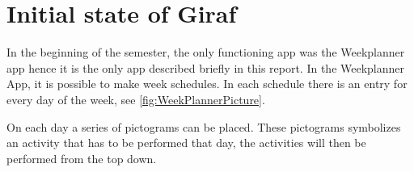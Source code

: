 \section{Initial state of Giraf}
In the beginning of the semester, the only functioning app was the Weekplanner app\cite{AppsStatus2019} hence it is the only app described briefly in this report. In the Weekplanner App, it is possible to make week schedules. In each schedule there is an entry for every day of the week, see \autoref{fig:WeekPlannerPicture}. 


On each day a series of pictograms can be placed. These pictograms symbolizes an activity that has to be performed that day, the activities will then be performed from the top down. 

